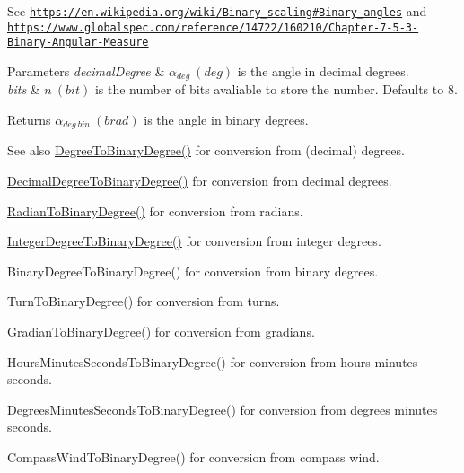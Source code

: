 See \href{https://en.wikipedia.org/wiki/Binary_scaling#Binary_angles}{\tt https\+://en.\+wikipedia.\+org/wiki/\+Binary\+\_\+scaling\#\+Binary\+\_\+angles} and \href{https://www.globalspec.com/reference/14722/160210/Chapter-7-5-3-Binary-Angular-Measure}{\tt https\+://www.\+globalspec.\+com/reference/14722/160210/\+Chapter-\/7-\/5-\/3-\/\+Binary-\/\+Angular-\/\+Measure} 
\begin{DoxyParams}{Parameters}
{\em decimal\+Degree} & $\alpha_{deg}\ (deg)$ is the angle in decimal degrees. \\
\hline
{\em bits} & $n\ (bit)$ is the number of bits avaliable to store the number. Defaults to 8. \\
\hline
\end{DoxyParams}
\begin{DoxyReturn}{Returns}
$\alpha_{deg\ bin}\ (brad)$ is the angle in binary degrees. 
\end{DoxyReturn}
\begin{DoxySeeAlso}{See also}
\mbox{\hyperlink{group___e_g_x_math-_angle_conversions-_degree_gacd1e3dc5194e89426a899a7cac4874f8}{Degree\+To\+Binary\+Degree()}} for conversion from (decimal) degrees. 

\mbox{\hyperlink{group___e_g_x_math-_angle_conversions-_decimal_degree_gaceec7ae7988c7f342d0b0fa6940720a1}{Decimal\+Degree\+To\+Binary\+Degree()}} for conversion from decimal degrees. 

\mbox{\hyperlink{group___e_g_x_math-_angle_conversions-_radian_ga13311d9b6977d514f1d6c336e7c0162b}{Radian\+To\+Binary\+Degree()}} for conversion from radians. 

\mbox{\hyperlink{group___e_g_x_math-_angle_conversions-_integer_degree_ga694bbfe624c3c14e97ce6155ca9bc44d}{Integer\+Degree\+To\+Binary\+Degree()}} for conversion from integer degrees. 

Binary\+Degree\+To\+Binary\+Degree() for conversion from binary degrees. 

Turn\+To\+Binary\+Degree() for conversion from turns. 

Gradian\+To\+Binary\+Degree() for conversion from gradians. 

Hours\+Minutes\+Seconds\+To\+Binary\+Degree() for conversion from hours minutes seconds. 

Degrees\+Minutes\+Seconds\+To\+Binary\+Degree() for conversion from degrees minutes seconds. 

Compass\+Wind\+To\+Binary\+Degree() for conversion from compass wind. 
\end{DoxySeeAlso}
\mbox{\label{group___e_g_x_math-_angle_conversions-_decimal_degree_ga415a94651a2b2397b7f2bda90a19ee2c}} 
